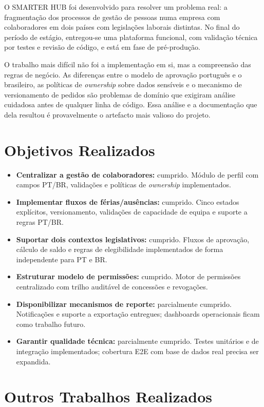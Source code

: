 \documentclass[12pt, a4paper, twoside, openright]{report}
\begin{document}
O SMARTER HUB foi desenvolvido para resolver um problema real: a fragmentação dos
processos de gestão de pessoas numa empresa com colaboradores em dois países com
legislações laborais distintas. No final do período de estágio, entregou-se uma plataforma funcional, com
validação técnica por testes e revisão de código, e está em fase de pré-produção.

O trabalho mais difícil não foi a implementação em si, mas a compreensão das regras de
negócio. As diferenças entre o modelo de aprovação português e o brasileiro, as
políticas de \textit{ownership} sobre dados sensíveis e o mecanismo de versionamento
de pedidos são problemas de domínio que exigiram análise cuidadosa antes de qualquer
linha de código. Essa análise e a documentação que dela resultou é provavelmente
o artefacto mais valioso do projeto.

\section{Objetivos Realizados}

\begin{itemize}
  \item \textbf{Centralizar a gestão de colaboradores:} cumprido. Módulo de perfil
        com campos PT/BR, validações e políticas de \textit{ownership} implementados.
  \item \textbf{Implementar fluxos de férias/ausências:} cumprido. Cinco estados
        explícitos, versionamento, validações de capacidade de equipa e suporte
        a regras PT/BR.
  \item \textbf{Suportar dois contextos legislativos:} cumprido. Fluxos de aprovação,
        cálculo de saldo e regras de elegibilidade implementados de forma independente
        para PT e BR.
  \item \textbf{Estruturar modelo de permissões:} cumprido. Motor de permissões
        centralizado com trilho auditável de concessões e revogações.
  \item \textbf{Disponibilizar mecanismos de reporte:} parcialmente cumprido. Notificações e suporte a exportação entregues; dashboards operacionais
        ficam como trabalho futuro.
  \item \textbf{Garantir qualidade técnica:} parcialmente cumprido. Testes unitários e de integração implementados; cobertura E2E com base de dados real precisa ser expandida.
\end{itemize}

\section{Outros Trabalhos Realizados}
\end{document}
